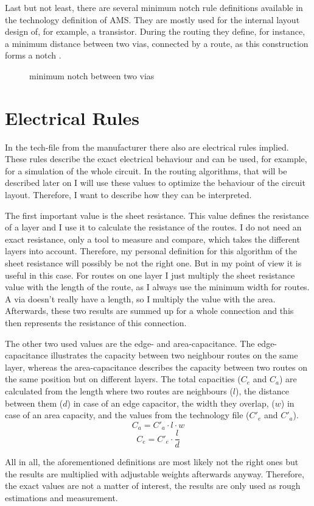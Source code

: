 Last but not least, there are several minimum notch rule definitions available in the technology definition of AMS. They are mostly used for the internal layout design of, for example, a transistor. During the routing they define, for instance, a minimum distance between two vias, connected by a route, as this construction forms a notch .

\begin{figure}
	\centering
	
	\caption{minimum notch between two vias}
	\label{fig:technology_rule_notch}
\end{figure}

\section{Electrical Rules}
\label{sec:electrical_rules}
In the tech-file from the manufacturer there also are electrical rules implied. These rules describe the exact electrical behaviour and can be used, for example, for a simulation of the whole circuit. In the routing algorithms, that will be described later on  I will use these values to optimize the behaviour of the circuit layout. Therefore, I want to describe how they can be interpreted.

The first important value is the sheet resistance. This value defines the resistance of a layer and I use it to calculate the resistance of the routes. I do not need an exact resistance, only a tool to measure and compare, which takes the different layers into account. Therefore, my personal definition for this algorithm of the sheet resistance will possibly be not the right one. But in my point of view it is useful in this case. For routes on one layer I just multiply the sheet resistance value with the length of the route, as I always use the minimum width for routes. A via doesn't really have a length, so I multiply the value with the area. Afterwards, these two results are summed up for a whole connection and this then represents the resistance of this connection.

The other two used values are the edge- and area-capacitance. The edge-capacitance illustrates the capacity between two neighbour routes on the same layer, whereas the area-capacitance describes the capacity between two routes on the same position but on different layers. The total capacities ($C_e$ and $C_a$) are calculated from the length where two routes are neighbours ($l$), the distance between them ($d$) in case of an edge capacitor, the width they overlap, ($w$) in case of an area capacity, and the values from the technology file ($C'_e$ and $C'_a$).
\[C_a = C'_a \cdot l \cdot w\]
\[C_e = C'_e \cdot \frac{l}{d}\]

All in all, the aforementioned definitions are most likely not the right ones but the results are multiplied with adjustable weights afterwards anyway. Therefore, the exact values are not a matter of interest, the results are only used as rough estimations and measurement.





